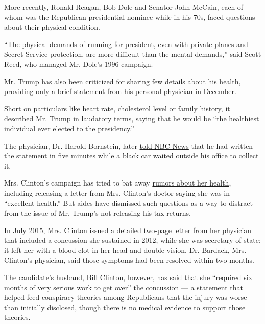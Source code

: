 More recently, Ronald Reagan, Bob Dole and Senator John McCain, each of
whom was the Republican presidential nominee while in his 70s, faced
questions about their physical condition.

``The physical demands of running for president, even with private
planes and Secret Service protection, are more difficult than the mental
demands,'' said Scott Reed, who managed Mr. Dole's 1996 campaign.

Mr. Trump has also been criticized for sharing few details about his
health, providing only a
\href{https://www.nytimes3xbfgragh.onion/politics/first-draft/2015/12/14/donald-trump-releases-medical-report-calling-his-health-extraordinary/}{brief
statement from his personal physician} in December.

Short on particulars like heart rate, cholesterol level or family
history, it described Mr. Trump in laudatory terms, saying that he would
be ``the healthiest individual ever elected to the presidency.''

The physician, Dr. Harold Bornstein, later
\href{http://www.nbcnews.com/news/us-news/trump-doctor-wrote-health-letter-just-5-minutes-limo-waited-n638526}{told
NBC News} that he had written the statement in five minutes while a
black car waited outside his office to collect it.

Mrs. Clinton's campaign has tried to bat away
\href{http://www.nytimes3xbfgragh.onion/2016/08/23/us/politics/clinton-trump-health.html}{rumors
about her health}, including releasing a letter from Mrs. Clinton's
doctor saying she was in ``excellent health.'' But aides have dismissed
such questions as a way to distract from the issue of Mr. Trump's not
releasing his tax returns.

In July 2015, Mrs. Clinton issued a detailed
\href{http://www.nytimes3xbfgragh.onion/politics/first-draft/2015/07/31/doctor-says-hillary-clinton-is-fit-to-serve/}{two-page
letter from her physician} that included a concussion she sustained in
2012, while she was secretary of state; it left her with a blood clot in
her head and double vision. Dr. Bardack, Mrs. Clinton's physician, said
those symptoms had been resolved within two months.

The candidate's husband, Bill Clinton, however, has said that she
``required six months of very serious work to get over'' the concussion
--- a statement that helped feed conspiracy theories among Republicans
that the injury was worse than initially disclosed, though there is no
medical evidence to support those theories.


